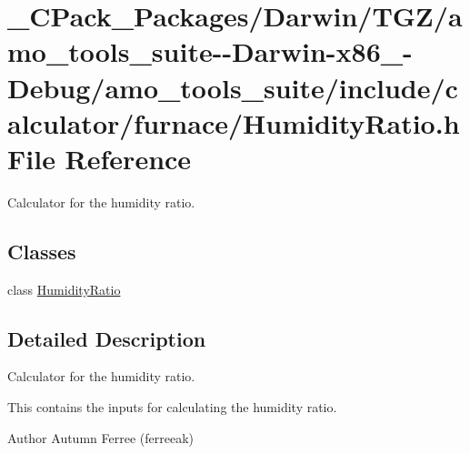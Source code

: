 \hypertarget{___c_pack___packages_2_darwin_2_t_g_z_2amo__tools__suite--_darwin-x86__64-_debug_2amo__tools__su39cfe7459a3e85288912698c694af759}{}\section{\+\_\+\+C\+Pack\+\_\+\+Packages/\+Darwin/\+T\+G\+Z/amo\+\_\+tools\+\_\+suite-\/-\/\+Darwin-\/x86\+\_-\/\+Debug/amo\+\_\+tools\+\_\+suite/include/calculator/furnace/\+Humidity\+Ratio.h File Reference}
\label{___c_pack___packages_2_darwin_2_t_g_z_2amo__tools__suite--_darwin-x86__64-_debug_2amo__tools__su39cfe7459a3e85288912698c694af759}


Calculator for the humidity ratio.  


\subsection*{Classes}
\begin{DoxyCompactItemize}
\item 
class \hyperlink{class_humidity_ratio}{Humidity\+Ratio}
\end{DoxyCompactItemize}


\subsection{Detailed Description}
Calculator for the humidity ratio. 

This contains the inputs for calculating the humidity ratio.

\begin{DoxyAuthor}{Author}
Autumn Ferree (ferreeak) 
\end{DoxyAuthor}

